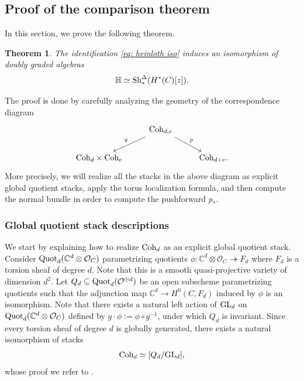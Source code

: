 \documentclass[10pt]{amsart}
\newcommand{\BC}{\mathbb{C}}
\newcommand{\BH}{\mathbb{H}}
\newcommand{\CO}{\mathcal{O}}
\newcommand{\Quot}{\textnormal{Quot}}
\newcommand{\Coh}{\textnormal{Coh}}
\newcommand{\+}{{}^+}
\newcommand{\GL}{\textnormal{GL}}
\newcommand{\Sh}{\textnormal{Sh}}
\newtheorem{theorem}{Theorem}[section]
\theoremstyle{definition}
\theoremstyle {definition}
\theoremstyle {definition}
\begin{document}
\subsection{Proof of the comparison theorem}

In this section, we prove the following theorem. 
\begin{theorem}\label{thm: CoHA equals shuffle}
The identification \eqref{eq: heinloth iso} induces an isomorphism of doubly graded algebras 
$$\BH\simeq \Sh_*^{\Delta}(H^{*}(C)[z]). 
$$
\end{theorem}

The proof is done by carefully analyzing the geometry of the correspondence diagram
\begin{equation*}
\begin{tikzcd}
  & \Coh_{d,e} \arrow[ld, "q"'] \arrow[rd, "p"] &   \\
\Coh_d\times \Coh_e &                                    & \Coh_{d+e}.
\end{tikzcd}
\end{equation*}
More precisely, we will realize all the stacks in the above diagram as explicit global quotient stacks, apply the torus localization formula, and then compute the normal bundle in order to compute the pushforward $p_*$. 



\subsubsection{Global quotient stack descriptions}\label{sec: quotient stack description} 

We start by explaining how to realize $\Coh_d$ as an explicit global quotient stack. Consider $\Quot_d(\BC^d\otimes\CO_C)$ parametrizing quotients $\phi:\BC^d\otimes\CO_C\twoheadrightarrow F_d$ where $F_d$ is a torsion sheaf of degree $d$. Note that this is a smooth quasi-projective variety of dimension $d^2$. Let $Q_d\subseteq \Quot_d(\CO^{\oplus d})$ be an open subscheme parametrizing quotients such that the adjunction map $\BC^d\rightarrow H^0(C,F_d)$ induced by $\phi$ is an isomorphism. Note that there exists a natural left action of $\GL_d$ on $\Quot_d(\BC^d\otimes\CO_C)$ defined by $g\cdot \phi:=\phi\circ g^{-1}$, under which $Q_d$ is invariant. Since every torsion sheaf of degree $d$ is globally generated, there exists a natural isomorphism of stacks 
\begin{equation}\label{eq: quotient description for Coh_d}
    \Coh_d\simeq[Q_d/\GL_d],
\end{equation}
whose proof we refer to \cite[Prop. 1.3]{Minets}. 
\end{document}
